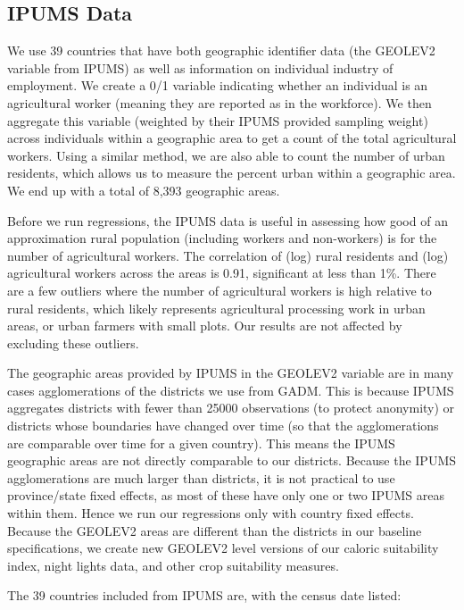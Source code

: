 \documentclass[11pt]{article}
\begin{document}
\subsection{IPUMS Data}
We use 39 countries that have both geographic identifier data (the GEOLEV2 variable from IPUMS) as well as information on individual industry of employment. We create a 0/1 variable indicating whether an individual is an agricultural worker (meaning they are reported as in the workforce). We then aggregate this variable (weighted by their IPUMS provided sampling weight) across individuals within a geographic area to get a count of the total agricultural workers. Using a similar method, we are also able to count the number of urban residents, which allows us to measure the percent urban within a geographic area. We end up with a total of 8,393 geographic areas.

Before we run regressions, the IPUMS data is useful in assessing how good of an approximation rural population (including workers and non-workers) is for the number of agricultural workers. The correlation of (log) rural residents and (log) agricultural workers across the areas is 0.91, significant at less than 1\%. There are a few outliers where the number of agricultural workers is high relative to rural residents, which likely represents agricultural processing work in urban areas, or urban farmers with small plots. Our results are not affected by excluding these outliers.

The geographic areas provided by IPUMS in the GEOLEV2 variable are in many cases agglomerations of the districts we use from GADM. This is because IPUMS aggregates districts with fewer than 25000 observations (to protect anonymity) or districts whose boundaries have changed over time (so that the agglomerations are comparable over time for a given country). This means the IPUMS geographic areas are not directly comparable to our districts. Because the IPUMS agglomerations are much larger than districts, it is not practical to use province/state fixed effects, as most of these have only one or two IPUMS areas within them. Hence we run our regressions only with country fixed effects. Because the GEOLEV2 areas are different than the districts in our baseline specifications, we create new GEOLEV2 level versions of our caloric suitability index, night lights data, and other crop suitability measures. 

The 39 countries included from IPUMS are, with the census date listed: 
 
\end{document}
